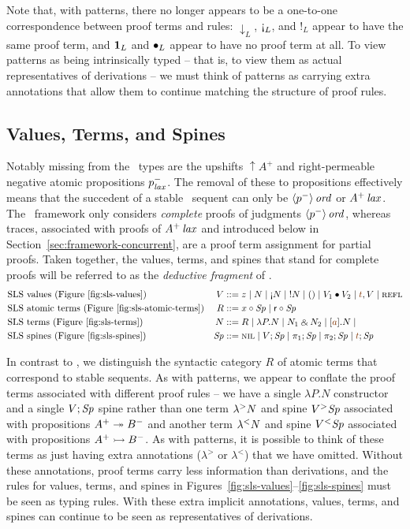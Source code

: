 Note that, with patterns, there no longer appears to be a one-to-one
correspondence between proof terms and rules: ${\downarrow}_L$,
${\gnab}_L$, and ${!}_L$ appear to have the same proof term, and
${\mathbf{1}}_L$ and ${\mathbin{\bullet}}_L$ appear to have no proof term at all. To
view patterns as being intrinsically typed -- that is, to view them as
actual representatives of derivations -- we must think of patterns as
carrying extra annotations that allow them to continue matching the
structure of proof rules.

\subsection{Values, Terms, and Spines}
\label{sec:framework-deductive}

Notably missing from the \sls~types are the upshifts ${\uparrow}A^+$
and right-permeable negative atomic propositions $p^-_{\it lax}$. The
removal of these to propositions effectively means that the succedent
of a stable \sls~sequent can only be ${\langle {p^-} \rangle}\,{{\it ord}}$ or
${A^+}\,{{\it lax}}$. The \sls~framework only considers {\it complete} proofs
of judgments ${\langle {p^-} \rangle}\,{{\it ord}}$, whereas traces, associated with
proofs of ${A^+}\,{{\it lax}}$ and introduced below in
Section~\ref{sec:framework-concurrent}, are a proof term assignment
for partial proofs. Taken together, the values, terms, and spines that
stand for complete proofs will be referred to as the {\it deductive
  fragment} of \sls.
\begin{align*}
&\mbox{\sls~values (Figure~\ref{fig:sls-values})}& 
V & ::= z
   \mid N
   \mid \tgnabr{N}
   \mid \tbangr{N}
   \mid \toner
   \mid \tfuser{V_1}{V_2}
   \mid \texistsr{\lf{t}}{V}
   \mid \tunifr
\\
&\mbox{\sls~atomic terms (Figure~\ref{fig:sls-atomic-terms})}&
R & ::= \tfocusl{x}{\Sp} 
   \mid \tfocusl{\sf r}{\Sp} 
\\
&\mbox{\sls~terms (Figure~\ref{fig:sls-terms})}&
N & ::= R
   \mid \lambda P.N 
   \mid N_1 \with N_2
   \mid \tforallr{\lf{a}}{N}
   \mid 
\\
&\mbox{\sls~spines (Figure~\ref{fig:sls-spines})}&
\Sp & ::= \tnil 
   \mid V; \Sp
   \mid \pi_1; \Sp 
   \mid \pi_2; \Sp
   \mid \lf{t}; \Sp
\end{align*}

In contrast to \ollll, we distinguish the syntactic category $R$ of
atomic terms that correspond to stable sequents. As with patterns, we
appear to conflate the proof terms associated with different proof
rules -- we have a single $\lambda P.N$ constructor and a single
$V;{\it Sp}$ spine rather than one term ${\lambda}^{>}{N}$ and spine
${V}{^{>}}{{\it Sp}}$ associated with propositions $A^+ \twoheadrightarrow B^-$ and
another term ${\lambda}^{<}{N}$ and spine ${V}{^{<}}{{\it Sp}}$ associated with
propositions $A^+ \rightarrowtail B^-$.  As with patterns, it is possible to
think of these terms as just having extra annotations ($\lambda^>$ or
$\lambda^<$) that we have omitted.  Without these annotations, proof
terms carry less information than derivations, and the rules for
values, terms, and spines in
Figures~\ref{fig:sls-values}--\ref{fig:sls-spines} must be seen as
typing rules. With these extra implicit annotations, values, terms,
and spines can continue to be seen as representatives of derivations.

